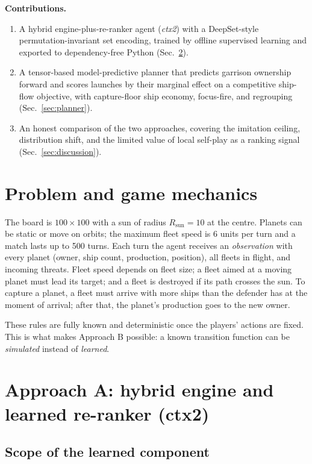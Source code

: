 \documentclass[conference]{IEEEtran}
\begin{document}
\textbf{Contributions.}
\begin{enumerate}
\item A hybrid engine-plus-re-ranker agent (\textit{ctx2}) with a DeepSet-style permutation-invariant set encoding, trained by offline supervised learning and exported to dependency-free Python (Sec.~\ref{sec:ctx2}).
\item A tensor-based model-predictive planner that predicts garrison ownership forward and scores launches by their marginal effect on a competitive ship-flow objective, with capture-floor ship economy, focus-fire, and regrouping (Sec.~\ref{sec:planner}).
\item An honest comparison of the two approaches, covering the imitation ceiling, distribution shift, and the limited value of local self-play as a ranking signal (Sec.~\ref{sec:discussion}).
\end{enumerate}

\section{Problem and game mechanics}

The board is $100 \times 100$ with a sun of radius $R_{\mathrm{sun}} = 10$ at the centre. Planets can be static or move on orbits; the maximum fleet speed is 6 units per turn and a match lasts up to 500 turns. Each turn the agent receives an \textit{observation} with every planet (owner, ship count, production, position), all fleets in flight, and incoming threats. Fleet speed depends on fleet size; a fleet aimed at a moving planet must lead its target; and a fleet is destroyed if its path crosses the sun. To capture a planet, a fleet must arrive with more ships than the defender has at the moment of arrival; after that, the planet's production goes to the new owner.

These rules are fully known and deterministic once the players' actions are fixed. This is what makes Approach B possible: a known transition function can be \emph{simulated} instead of \emph{learned}.

\section{Approach A: hybrid engine and learned re-ranker (ctx2)}
\label{sec:ctx2}

\subsection{Scope of the learned component}
\end{document}
